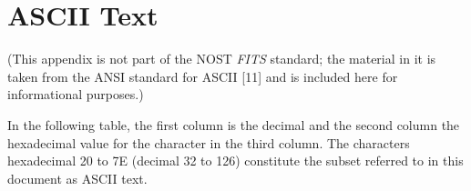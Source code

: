 \chapter{ASCII Text}
   \label{s:Atxt}

(This appendix is not part of the NOST {\em FITS\/} standard; the 
material in it is taken from the ANSI standard for ASCII [11] and is 
included here for informational purposes.)

In the following table, the first column is 
the decimal
and the second column the hexadecimal value for the character 
in the third column.  The characters hexadecimal 20 to 7E (decimal 32 
to 126) constitute the subset referred to in this document as 
ASCII text. 
                                                                               
